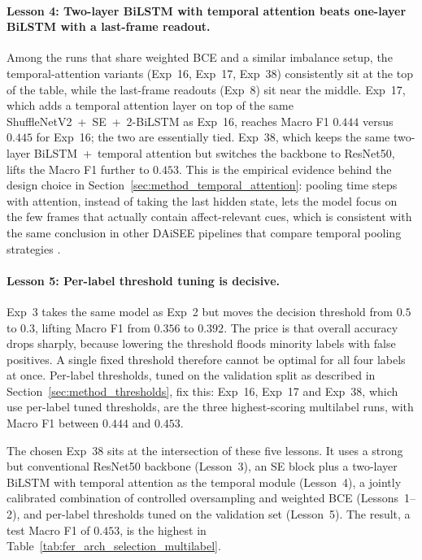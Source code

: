 \paragraph{Lesson 4: Two-layer BiLSTM with temporal attention beats one-layer BiLSTM with a last-frame readout.} Among the runs that share weighted BCE and a similar imbalance setup, the temporal-attention variants (Exp~16, Exp~17, Exp~38) consistently sit at the top of the table, while the last-frame readouts (Exp~8) sit near the middle. Exp~17, which adds a temporal attention layer on top of the same ShuffleNetV2~+~SE~+~2-BiLSTM as Exp~16, reaches Macro F1 $0.444$ versus $0.445$ for Exp~16; the two are essentially tied. Exp~38, which keeps the same two-layer BiLSTM~+~temporal attention but switches the backbone to ResNet50, lifts the Macro F1 further to $0.453$. This is the empirical evidence behind the design choice in Section~\ref{sec:method_temporal_attention}: pooling time steps with attention, instead of taking the last hidden state, lets the model focus on the few frames that actually contain affect-relevant cues, which is consistent with the same conclusion in other DAiSEE pipelines that compare temporal pooling strategies \cite{mehta_three-dimensional_2022,su_leveraging_2024,liu_dynamic_nodate}.

\paragraph{Lesson 5: Per-label threshold tuning is decisive.} Exp~3 takes the same model as Exp~2 but moves the decision threshold from $0.5$ to $0.3$, lifting Macro F1 from $0.356$ to $0.392$. The price is that overall accuracy drops sharply, because lowering the threshold floods minority labels with false positives. A single fixed threshold therefore cannot be optimal for all four labels at once. Per-label thresholds, tuned on the validation split as described in Section~\ref{sec:method_thresholds}, fix this: Exp~16, Exp~17 and Exp~38, which use per-label tuned thresholds, are the three highest-scoring multilabel runs, with Macro F1 between $0.444$ and $0.453$.

The chosen Exp~38 sits at the intersection of these five lessons. It uses a strong but conventional ResNet50 backbone (Lesson~3), an SE block plus a two-layer BiLSTM with temporal attention as the temporal module (Lesson~4), a jointly calibrated combination of controlled oversampling and weighted BCE (Lessons~1--2), and per-label thresholds tuned on the validation set (Lesson~5). The result, a test Macro F1 of $0.453$, is the highest in Table~\ref{tab:fer_arch_selection_multilabel}.

